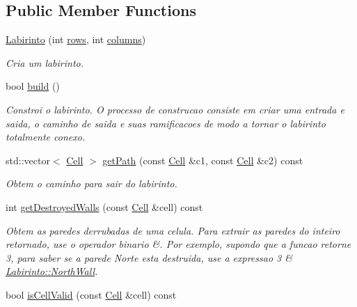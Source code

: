 \subsection*{Public Member Functions}
\begin{DoxyCompactItemize}
\item 
\hyperlink{class_labirinto_a086420b862b2009f7da95967a075bd36}{Labirinto} (int \hyperlink{class_labirinto_a4f8c7a42d8a5edad12482f4d2110626c}{rows}, int \hyperlink{class_labirinto_a6614a825d5e93ec1c053003a804ce2a7}{columns})
\begin{DoxyCompactList}\small\item\em Cria um labirinto. \end{DoxyCompactList}\item 
bool \hyperlink{class_labirinto_a02a05067a6380b1e720da444bb4718f7}{build} ()
\begin{DoxyCompactList}\small\item\em Constroi o labirinto. O processo de construcao consiste em criar uma entrada e saida, o caminho de saida e suas ramificacoes de modo a tornar o labirinto totalmente conexo. \end{DoxyCompactList}\item 
std\+::vector$<$ \hyperlink{struct_labirinto_1_1_cell}{Cell} $>$ \hyperlink{class_labirinto_a5560f3c1a18c95009ced3e855d53bebb}{get\+Path} (const \hyperlink{struct_labirinto_1_1_cell}{Cell} \&c1, const \hyperlink{struct_labirinto_1_1_cell}{Cell} \&c2) const 
\begin{DoxyCompactList}\small\item\em Obtem o caminho para sair do labirinto. \end{DoxyCompactList}\item 
int \hyperlink{class_labirinto_a9b6d4d4b8a3b53aa10761c8fc0e325d9}{get\+Destroyed\+Walls} (const \hyperlink{struct_labirinto_1_1_cell}{Cell} \&cell) const 
\begin{DoxyCompactList}\small\item\em Obtem as paredes derrubadas de uma celula. Para extrair as paredes do inteiro retornado, use o operador binario \&. Por exemplo, supondo que a funcao retorne 3, para saber se a parede Norte esta destruida, use a expressao \textquotesingle{}3 \& \hyperlink{class_labirinto_ab6ffda1571ea6394c382e12b4bb4c336a51cd26ae8c945f233f769e8f825576b7}{Labirinto\+::\+North\+Wall}\textquotesingle{}. \end{DoxyCompactList}\item 
bool \hyperlink{class_labirinto_a8054ff4d8c0712dffad07768bdcb1b6d}{is\+Cell\+Valid} (const \hyperlink{struct_labirinto_1_1_cell}{Cell} \&cell) const 

\end{DoxyCompactItemize}
